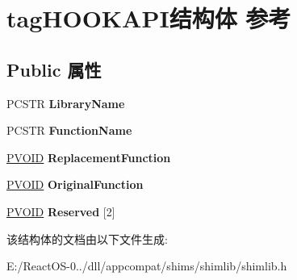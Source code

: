 \hypertarget{structtag_h_o_o_k_a_p_i}{}\section{tag\+H\+O\+O\+K\+A\+P\+I结构体 参考}
\label{structtag_h_o_o_k_a_p_i}
\subsection*{Public 属性}
\begin{DoxyCompactItemize}
\item 
\mbox{\label{structtag_h_o_o_k_a_p_i_a145098b9a9e08e651d9897f6b815fb80}} 
P\+C\+S\+TR {\bfseries Library\+Name}
\item 
\mbox{\label{structtag_h_o_o_k_a_p_i_a206f1aca71829fcb3c5a40aa4b47893c}} 
P\+C\+S\+TR {\bfseries Function\+Name}
\item 
\mbox{\label{structtag_h_o_o_k_a_p_i_a12a1dcaefbc98dbecbd6917db5554bdd}} 
\hyperlink{interfacevoid}{P\+V\+O\+ID} {\bfseries Replacement\+Function}
\item 
\mbox{\label{structtag_h_o_o_k_a_p_i_a7dcf1033dec3016b5e3e993bfb6984be}} 
\hyperlink{interfacevoid}{P\+V\+O\+ID} {\bfseries Original\+Function}
\item 
\mbox{\label{structtag_h_o_o_k_a_p_i_a3479cb01336d85562685ef9fb046f024}} 
\hyperlink{interfacevoid}{P\+V\+O\+ID} {\bfseries Reserved} \mbox{[}2\mbox{]}
\end{DoxyCompactItemize}


该结构体的文档由以下文件生成\+:\begin{DoxyCompactItemize}
\item 
E\+:/\+React\+O\+S-\/0../dll/appcompat/shims/shimlib/shimlib.\+h\end{DoxyCompactItemize}
